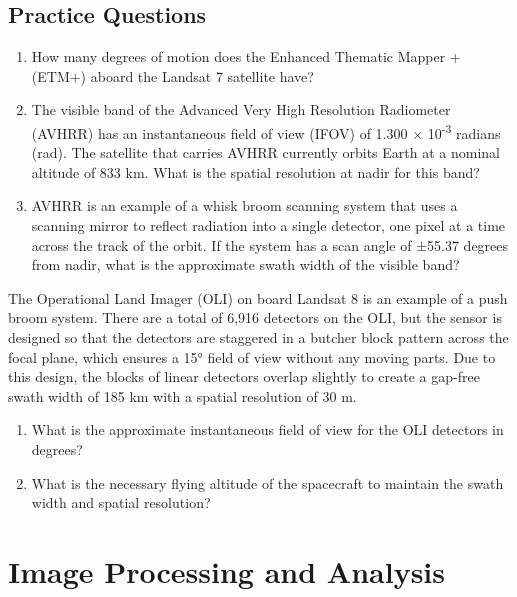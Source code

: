\documentclass[
]{book}
\providecommand{\tightlist}{%
  \setlength{\itemsep}{0pt}\setlength{\parskip}{0pt}}
\begin{document}
\hypertarget{practice-questions-5}{%
\section*{Practice Questions}\label{practice-questions-5}}

\begin{enumerate}
\def\labelenumi{\arabic{enumi}.}
\tightlist
\item
  How many degrees of motion does the Enhanced Thematic Mapper + (ETM+) aboard the Landsat 7 satellite have?
\item
  The visible band of the Advanced Very High Resolution Radiometer (AVHRR) has an instantaneous field of view (IFOV) of 1.300 × 10\textsuperscript{-3} radians (rad). The satellite that carries AVHRR currently orbits Earth at a nominal altitude of 833 km. What is the spatial resolution at nadir for this band?
\item
  AVHRR is an example of a whisk broom scanning system that uses a scanning mirror to reflect radiation into a single detector, one pixel at a time across the track of the orbit. If the system has a scan angle of ±55.37 degrees from nadir, what is the approximate swath width of the visible band?
\end{enumerate}

The Operational Land Imager (OLI) on board Landsat 8 is an example of a push broom system. There are a total of 6,916 detectors on the OLI, but the sensor is designed so that the detectors are staggered in a butcher block pattern across the focal plane, which ensures a 15° field of view without any moving parts. Due to this design, the blocks of linear detectors overlap slightly to create a gap-free swath width of 185 km with a spatial resolution of 30 m.

\begin{enumerate}
\def\labelenumi{\arabic{enumi}.}
\setcounter{enumi}{3}
\tightlist
\item
  What is the approximate instantaneous field of view for the OLI detectors in degrees?
\item
  What is the necessary flying altitude of the spacecraft to maintain the swath width and spatial resolution?
\end{enumerate}

\hypertarget{image-processing-and-analysis}{%
\chapter{Image Processing and Analysis}\label{image-processing-and-analysis}}
\end{document}
